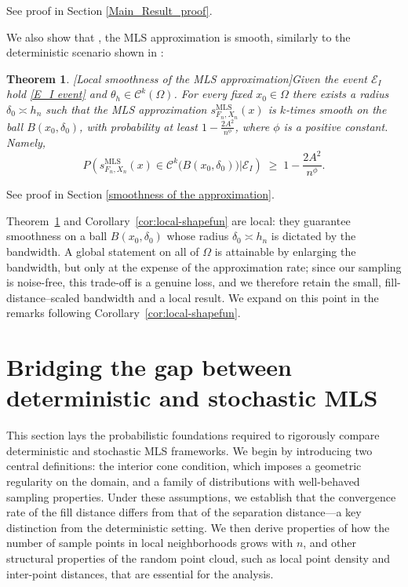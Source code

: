 \documentclass{article}
\newtheorem{theorem}{Theorem}
\begin{document}
See proof in Section \ref{Main_Result_proof}.

We also show that , the MLS approximation is smooth, similarly to the deterministic scenario shown in \cite{levin1998approximation}:

\begin{theorem}

[Local smoothness of the MLS approximation]\label{thm:local-smoothness}
Given the event $\mathscr{E}_I$ hold \eqref{E_I event} and $\theta_h \in \mathcal{C}^k(\Omega)$. For every fixed $x_0 \in \Omega$ there exists a
radius $\delta_0 \asymp h_n$ such that the MLS approximation
$s^{\mathrm{MLS}}_{F_n,X_n}(x)$ is $k$-times smooth on the ball
$B(x_0,\delta_0)$, with probability at least $1 - \tfrac{2A^2}{n^{\phi}}$, where
$\phi$ is a positive constant. Namely,
\[
  P\!\left( s^{\mathrm{MLS}}_{F_n,X_n}(x) \in \mathcal{C}^k\!\big(B(x_0,\delta_0)\big)\Big|\mathscr{E}_I \right)
  \;\ge\; 1 - \frac{2A^2}{n^{\phi}}.
\]
\label{theorem of smoothness}
\end{theorem}
See proof in Section \ref{smoothness of the approximation}.

Theorem~\ref{thm:local-smoothness} and Corollary~\ref{cor:local-shapefun}
are local: they guarantee smoothness on a ball $B(x_0,\delta_0)$ whose radius
$\delta_0 \asymp h_n$ is dictated by the bandwidth. A global statement on all
of $\Omega$ is attainable by enlarging the bandwidth, but only at the expense
of the approximation rate; since our sampling is noise-free, this trade-off is
a genuine loss, and we therefore retain the small, fill-distance--scaled
bandwidth and a local result. We expand on this point in the remarks following
Corollary~\ref{cor:local-shapefun}.  

\section{Bridging the gap between deterministic and stochastic MLS}

This section lays the probabilistic foundations required to rigorously compare deterministic and stochastic MLS frameworks. We begin by introducing two central definitions: the interior cone condition, which imposes a geometric regularity on the domain, and a family of distributions with well-behaved sampling properties. Under these assumptions, we establish that the convergence rate of the fill distance differs from that of the separation distance—a key distinction from the deterministic setting. We then derive properties of how the number of sample points in local neighborhoods grows with 
$n$, and other structural properties of the random point cloud, such as local point density and inter-point distances, that are essential for the analysis.
\end{document}

